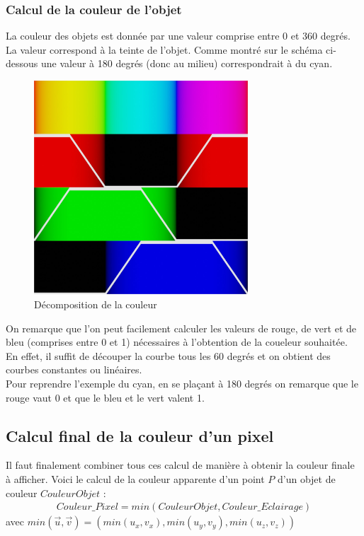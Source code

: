 \newpage
\subsubsection{Calcul de la couleur de l'objet}

La couleur des objets est donnée par une valeur comprise entre 0 et 360 degrés. La valeur correspond à la teinte de l'objet. Comme montré sur le schéma ci-dessous une valeur à 180 degrés (donc au milieu) correspondrait à du cyan.

\begin{figure}[h]
    \centering
    \includegraphics[width=8cm]{images/huetorgb.jpg}
    \caption{Décomposition de la couleur }\label{fig:huetorb}
\end{figure}

On remarque que l'on peut facilement calculer les valeurs de rouge, de vert et de bleu (comprises entre 0 et 1) nécessaires à l'obtention de la coueleur souhaitée.\\
En effet, il suffit de découper la courbe tous les 60 degrés et on obtient des courbes constantes ou linéaires.\\
Pour reprendre l'exemple du cyan, en se plaçant à 180 degrés on remarque que le rouge vaut 0 et que le bleu et le vert valent 1.


\subsection{Calcul final de la couleur d'un pixel}
Il faut finalement combiner tous ces calcul de manière à obtenir la couleur finale à afficher. Voici le calcul de la couleur apparente d'un point $P$ d'un objet de couleur $CouleurObjet$ :
\begin{align*}
    Couleur\_Pixel=min(CouleurObjet,Couleur\_Eclairage)%
\end{align*}
avec $min(\Vec{u},\Vec{v})=(min(u_x,v_x),min(u_y,v_y),min(u_z,v_z))$